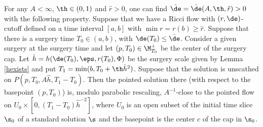 \begin{lemma}
  \label{lem:kl-evolution-surgery-cap-existence-standard-solutions-2}
 \label{intermediate}
For any $A<\infty$, $\th\in (0,1)$ and $\hat r>0$,
one can find $\hat\de=\hat\de(A,\th,\hat r)>0$
with the following property.  Suppose that we
have a Ricci flow with $(r, \de)$-cutoff
defined on a time interval $[a,b]$ with  $\min r=r(b)\geq \hat r$.
Suppose that there is a surgery time
$T_0\in (a,b)$, with $\de(T_0)\leq \hat\de$.  Consider a given
surgery at the surgery time and let
$(p,T_0)\in\M_{T_0}^+$
be the center of the surgery cap.
Let $\hat h= h(\de(T_0),\eps,r(T_0),\Phi)$ be the surgery
scale given by Lemma \ref{hexists} and put
$T_1=\min(b,T_0+\th \hat h^2)$.
Suppose that the solution is unscathed on $P(p,T_0,A\hat h,T_1-T_0)$.
Then the pointed solution there (with respect to the basepoint
$(p, T_0)$) is, modulo parabolic
rescaling, $A^{-1}$-close to the pointed flow on
$U_0\times [0,(T_1-T_0)\hat h^{-2}]$, where
$U_0$ is an open subset of the initial time slice $\s_0$
of a standard solution
$\s$ and the basepoint is
the center $c$ of the cap in $\s_0$.
\end{lemma}
